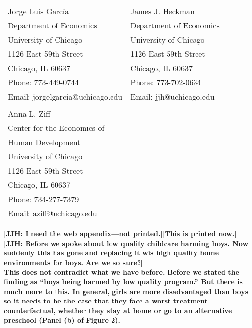 \bigskip
\begin{tabular}{ll}
Jorge Luis Garc\'{i}a                                       & James J. Heckman \\
Department of Economics                                & Department of Economics \\
University of Chicago                                       & University of Chicago \\
1126 East 59th Street                                     & 1126 East 59th Street \\
Chicago, IL 60637                                           & Chicago, IL 60637 \\
Phone: 773-449-0744                                    & Phone: 773-702-0634  \\
Email: jorgelgarcia@uchicago.edu                       & Email: jjh@uchicago.edu \\
                                                                       & \\
Anna L. Ziff                                         &  \\
Center for the Economics of & \\
Human Development            & \\
University of Chicago                                        &  \\
1126 East 59th Street                       & \\
Chicago, IL 60637                                              &       \\
Phone: 734-277-7379                                    &  \\
Email: aziff@uchicago.edu                     &  \\

\end{tabular}

\clearpage

\vspace{3 em}
\noindent \textbf{[JJH: I need the web appendix---not printed.][This is printed now.]} \\

\noindent \textbf{[JJH: Before we spoke about low quality childcare harming boys. Now suddenly this has gone and replacing it wis high quality home environments for boys. Are we so sure?]} \\

\noindent \textbf{This does not contradict what we have before. Before we stated the finding as ``boys being harmed by low quality program.'' But there is much more to this. In general, girls are more disadvantaged than boys so it needs to be the case that they face a worst treatment counterfactual, whether they stay at home or go to an alternative preschool (Panel (b) of Figure 2).} \\

